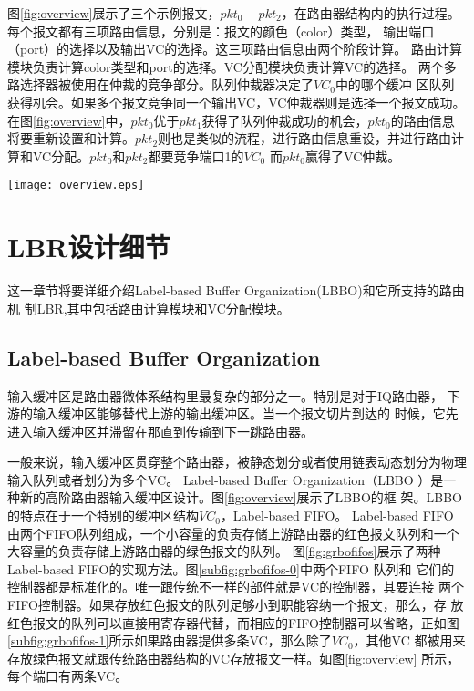图\ref{fig:overview}展示了三个示例报文，$pkt_0-pkt_2$，在路由器结构内的执行过程。每个报文都有三项路由信息，分别是：报文的颜色（color）类型，
输出端口（port）的选择以及输出VC的选择。这三项路由信息由两个阶段计算。
路由计算模块负责计算color类型和port的选择。VC分配模块负责计算VC的选择。
两个多路选择器被使用在仲裁的竞争部分。队列仲裁器决定了$VC_0$中的哪个缓冲
区队列获得机会。如果多个报文竞争同一个输出VC，VC仲裁器则是选择一个报文成功。在图\ref{fig:overview}中，$pkt_0$优于$pkt_1$获得了队列仲裁成功的机会，$pkt_0$的路由信息将要重新设置和计算。$pkt_2$则也是类似的流程，进行路由信息重设，并进行路由计算和VC分配。$pkt_0$和$pkt_2$都要竞争端口1的$VC_0$ 而$pkt_0$赢得了VC仲裁。


\begin{figure*}[t]
  \centering
  \texttt{[image: overview.eps]}
  \caption{LBBO结构和LBR的工作流程}
  \label{fig:overview}
\end{figure*}

\section{LBR设计细节}

这一章节将要详细介绍Label-based Buffer Organization(LBBO)和它所支持的路由机
制LBR,其中包括路由计算模块和VC分配模块。

\subsection{Label-based Buffer Organization}

输入缓冲区是路由器微体系结构里最复杂的部分之一。特别是对于IQ路由器，
下游的输入缓冲区能够替代上游的输出缓冲区。当一个报文切片到达的
时候，它先进入输入缓冲区并滞留在那直到传输到下一跳路由器。

一般来说，输入缓冲区贯穿整个路由器，被静态划分或者使用链表动态划分为物理输入队列或者划分为多个VC。
Label-based Buffer Organization（LBBO
）是一种新的高阶路由器输入缓冲区设计。图\ref{fig:overview}展示了LBBO的框
架。LBBO的特点在于一个特别的缓冲区结构$VC_0$，Label-based FIFO。 Label-based
FIFO 由两个FIFO队列组成，一个小容量的负责存储上游路由器的红色报文队列和一个大容量的负责存储上游路由器的绿色报文的队列。
图\ref{fig:grbofifos}展示了两种Label-based FIFO的实现方法。图\ref{subfig:grbofifos-0}中两个FIFO 队列和
它们的控制器都是标准化的。唯一跟传统不一样的部件就是VC的控制器，其要连接
两个FIFO控制器。如果存放红色报文的队列足够小到职能容纳一个报文，那么，存
放红色报文的队列可以直接用寄存器代替，而相应的FIFO控制器可以省略，正如图
\ref{subfig:grbofifos-1}所示如果路由器提供多条VC，那么除了$VC_0$，其他VC
都被用来存放绿色报文就跟传统路由器结构的VC存放报文一样。如图\ref{fig:overview} 所示，
每个端口有两条VC。

